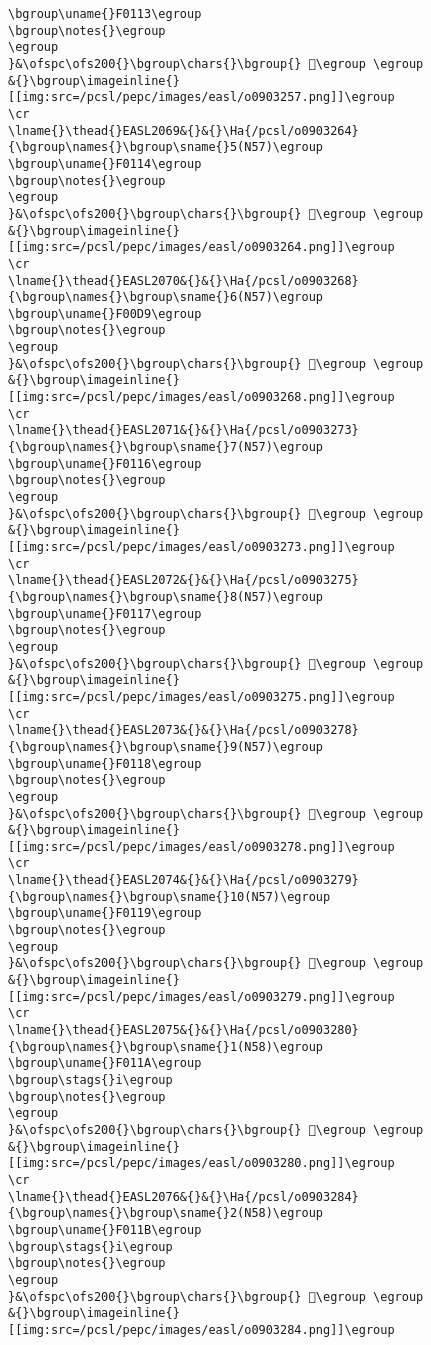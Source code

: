 \begin{verbatim}
\bgroup\uname{}F0113\egroup
\bgroup\notes{}\egroup
\egroup
}&\ofspc\ofs200{}\bgroup\chars{}\bgroup{} 󰄓\egroup \egroup
&{}\bgroup\imageinline{}[[img:src=/pcsl/pepc/images/easl/o0903257.png]]\egroup
\cr
\lname{}\thead{}EASL2069&{}&{}\Ha{/pcsl/o0903264}{\bgroup\names{}\bgroup\sname{}5(N57)\egroup
\bgroup\uname{}F0114\egroup
\bgroup\notes{}\egroup
\egroup
}&\ofspc\ofs200{}\bgroup\chars{}\bgroup{} 󰄔\egroup \egroup
&{}\bgroup\imageinline{}[[img:src=/pcsl/pepc/images/easl/o0903264.png]]\egroup
\cr
\lname{}\thead{}EASL2070&{}&{}\Ha{/pcsl/o0903268}{\bgroup\names{}\bgroup\sname{}6(N57)\egroup
\bgroup\uname{}F00D9\egroup
\bgroup\notes{}\egroup
\egroup
}&\ofspc\ofs200{}\bgroup\chars{}\bgroup{} 󰃙\egroup \egroup
&{}\bgroup\imageinline{}[[img:src=/pcsl/pepc/images/easl/o0903268.png]]\egroup
\cr
\lname{}\thead{}EASL2071&{}&{}\Ha{/pcsl/o0903273}{\bgroup\names{}\bgroup\sname{}7(N57)\egroup
\bgroup\uname{}F0116\egroup
\bgroup\notes{}\egroup
\egroup
}&\ofspc\ofs200{}\bgroup\chars{}\bgroup{} 󰄖\egroup \egroup
&{}\bgroup\imageinline{}[[img:src=/pcsl/pepc/images/easl/o0903273.png]]\egroup
\cr
\lname{}\thead{}EASL2072&{}&{}\Ha{/pcsl/o0903275}{\bgroup\names{}\bgroup\sname{}8(N57)\egroup
\bgroup\uname{}F0117\egroup
\bgroup\notes{}\egroup
\egroup
}&\ofspc\ofs200{}\bgroup\chars{}\bgroup{} 󰄗\egroup \egroup
&{}\bgroup\imageinline{}[[img:src=/pcsl/pepc/images/easl/o0903275.png]]\egroup
\cr
\lname{}\thead{}EASL2073&{}&{}\Ha{/pcsl/o0903278}{\bgroup\names{}\bgroup\sname{}9(N57)\egroup
\bgroup\uname{}F0118\egroup
\bgroup\notes{}\egroup
\egroup
}&\ofspc\ofs200{}\bgroup\chars{}\bgroup{} 󰄘\egroup \egroup
&{}\bgroup\imageinline{}[[img:src=/pcsl/pepc/images/easl/o0903278.png]]\egroup
\cr
\lname{}\thead{}EASL2074&{}&{}\Ha{/pcsl/o0903279}{\bgroup\names{}\bgroup\sname{}10(N57)\egroup
\bgroup\uname{}F0119\egroup
\bgroup\notes{}\egroup
\egroup
}&\ofspc\ofs200{}\bgroup\chars{}\bgroup{} 󰄙\egroup \egroup
&{}\bgroup\imageinline{}[[img:src=/pcsl/pepc/images/easl/o0903279.png]]\egroup
\cr
\lname{}\thead{}EASL2075&{}&{}\Ha{/pcsl/o0903280}{\bgroup\names{}\bgroup\sname{}1(N58)\egroup
\bgroup\uname{}F011A\egroup
\bgroup\stags{}i\egroup
\bgroup\notes{}\egroup
\egroup
}&\ofspc\ofs200{}\bgroup\chars{}\bgroup{} 󰄚\egroup \egroup
&{}\bgroup\imageinline{}[[img:src=/pcsl/pepc/images/easl/o0903280.png]]\egroup
\cr
\lname{}\thead{}EASL2076&{}&{}\Ha{/pcsl/o0903284}{\bgroup\names{}\bgroup\sname{}2(N58)\egroup
\bgroup\uname{}F011B\egroup
\bgroup\stags{}i\egroup
\bgroup\notes{}\egroup
\egroup
}&\ofspc\ofs200{}\bgroup\chars{}\bgroup{} 󰄛\egroup \egroup
&{}\bgroup\imageinline{}[[img:src=/pcsl/pepc/images/easl/o0903284.png]]\egroup

\end{verbatim}
